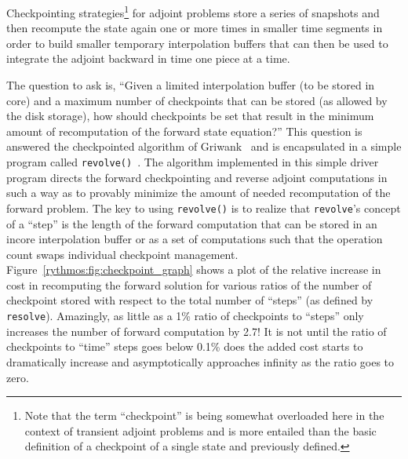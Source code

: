 \documentclass[pdf,ps2pdf,11pt]{SANDreport}
\begin{document}
Checkpointing strategies\footnote{Note that the term ``checkpoint'' is being
somewhat overloaded here in the context of transient adjoint problems and is
more entailed than the basic definition of a checkpoint of a single state and
previously defined.} for adjoint problems store a series of snapshots and then
recompute the state again one or more times in smaller time segments in order
to build smaller temporary interpolation buffers that can then be used to
integrate the adjoint backward in time one piece at a time.

The question to ask is, ``Given a limited interpolation buffer (to be stored
in core) and a maximum number of checkpoints that can be stored (as allowed by
the disk storage), how should checkpoints be set that result in the minimum
amount of recomputation of the forward state equation?''  This question is
answered the checkpointed algorithm of Griwank~\cite{347846} and is
encapsulated in a simple program called {}\texttt{revolve()}~\cite{347846}.
The algorithm implemented in this simple driver program directs the forward
checkpointing and reverse adjoint computations in such a way as to provably
minimize the amount of needed recomputation of the forward problem.  The key
to using {}\texttt{revolve()} is to realize that {}\texttt{revolve}'s concept
of a ``step'' is the length of the forward computation that can be stored in
an incore interpolation buffer or as a set of computations such that the
operation count swaps individual checkpoint management.
Figure~\ref{rythmos:fig:checkpoint_graph} shows a plot of the relative
increase in cost in recomputing the forward solution for various ratios of the
number of checkpoint stored with respect to the total number of ``steps'' (as
defined by {}\texttt{resolve}).  Amazingly, as little as a 1\% ratio of
checkpoints to ``steps'' only increases the number of forward computation by
2.7!  It is not until the ratio of checkpoints to ``time'' steps goes below
0.1\% does the added cost starts to dramatically increase and asymptotically
approaches infinity as the ratio goes to zero.
\end{document}
